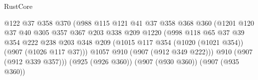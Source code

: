 \begin{lexlean}{RustCore}
\begin{coremodule}
                                            @122
                                            @37
                                            @358
                                            @370
                                            (@988
                                              @115
                                              @121
                                              @41
                                              @37
                                              @358
                                              @368
                                              @360
                                              (@1201
                                                @120
                                                @37
                                                @40
                                                @305
                                                @357
                                                @367
                                                @203
                                                @338
                                                @209
                                                @1220
                                                (@998
                                                  @118
                                                  @65
                                                  @37
                                                  @39
                                                  @354
                                                  @222
                                                  @238
                                                  @203
                                                  @348
                                                  @209
                                                  (@1015
                                                    @117
                                                    @354
                                                    (@1020 (@1021 @354))
                                                    (@907 (@1026 @117 @37)))
                                                  @1057
                                                  @910
                                                  (@907 (@912 @349 @222)))
                                                @910
                                                (@907 (@912 @339 @357)))
                                              (@925 (@926 @360))
                                              (@907 (@930 @360))
                                              (@907 (@935 @360))

\end{coremodule}
\end{lexlean}
